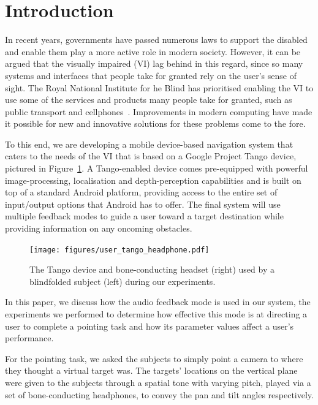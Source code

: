 \documentclass[format=sigconf, review=true, screen=true, anonymous=true]{acmart}
\begin{document}
\maketitle

\section{Introduction}

In recent years, governments have passed numerous laws to support the disabled and enable them play a more active role in modern society. However, it can be argued that the visually impaired (VI) lag behind in this regard, since so many systems and interfaces that people take for granted rely on the user's sense of sight. The Royal National Institute for he Blind has prioritised enabling the VI to use some of the services and products many people take for granted, such as public transport and cellphones~\cite{rnib-objectives}. Improvements in modern computing have made it possible for new and innovative solutions for these problems come to the fore.

To this end, we are developing a mobile device-based navigation system that caters to the needs of the VI that is based on a Google Project Tango device, pictured in Figure~\ref{fig:tango}. A Tango-enabled device comes pre-equipped with powerful image-processing, localisation and depth-perception capabilities and is built on top of a standard Android platform, providing access to the entire set of input/output options that Android has to offer. The final system will use multiple feedback modes to guide a user toward a target destination while providing information on any oncoming obstacles.

\begin{figure}
  \centering
  \texttt{[image: figures/user\_tango\_headphone.pdf]}
  \caption{The Tango device and bone-conducting headset (right) used by a blindfolded subject (left) during our experiments. }
  \label{fig:tango}
\end{figure}

In this paper, we discuss how the audio feedback mode is used in our system, the experiments we performed to determine how effective this mode is at directing a user to complete a pointing task and how its parameter values affect a user's performance. 

For the pointing task, we asked the subjects to simply point a camera to where they thought a virtual target was. The targets' locations on the vertical plane were given to the subjects through a spatial tone with varying pitch, played via a set of bone-conducting headphones, to convey the pan and tilt angles respectively. 
\end{document}
